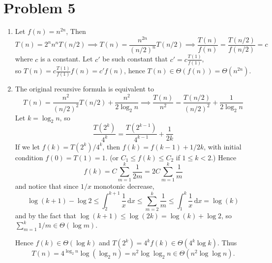 \documentclass[12pt, a4paper]{article}
\newcommand{\dI}{\,\mathrm{d}}
\begin{document}
\section{Problem 5}
\begin{enumerate}
  \item Let $f(n) = n^{2n}$, Then 
    \[ T(n) = 2^n n^n T(n/2) \implies T(n) = \frac{n^{2n}}{(n/2)^n} T(n/2) \implies 
      \frac{T(n)}{f(n)} = \frac{T(n/2)}{f(n/2)} = c\] 
    where $c$ is a constant. Let $c'$ be such constant that $c' = c \frac{T(1)}{f(1)}$,  \\
    so $T(n) = c\frac{T(1)}{f(1)} f(n) = c' f(n)$, hence $T(n) \in \Theta(f(n)) = \Theta(n^{2n})$.
  \item The original recursive formula is equivalent to
    \[ T(n) = \frac{n^2}{(n/2)^2} T(n/2) + \frac{n^2}{2 \log_2 n} \implies 
      \frac{T(n)}{n^2} = \frac{T(n/2)}{(n/2)^2} + \frac{1}{2 \log_2 n} \]
    Let $k = \log_2 n$, so
    \[ \frac{T(2^k)}{4^k} = \frac{T(2^{k-1})}{4^{k-1}} + \frac{1}{2k} \]
    If we let $f(k) = T(2^k) / 4^k$, then $f(k) = f(k-1) + 1 / 2k$, with initial condition $f(0) = 
    T(1) = 1$. (or $C_1 \leq f(k) \leq C_2$ if $1 \leq k < 2$.) Hence 
    \[ f(k) = C \sum_{m = 1}^{k} \frac{1}{2m} = 2C \sum_{m = 1}^{k} \frac{1}{m} \]
    and notice that since $1/x$ monotonic decrease, 
    \[ \log(k+1) - \log 2 \leq \int_{2}^{k+1} \frac{1}{x} \dI x \leq \sum_{m = 2}^{k} \frac{1}{m} 
      \leq \int_1^{k} \frac{1}{x} \dI x = \log(k) \]
    and by the fact that $\log(k+1) \leq \log(2k) = \log(k) + \log 2$, 
    so $\sum\limits_{m=1}^{k} 1/m \in \Theta(\log m)$.

    Hence $f(k) \in \Theta(\log k)$ and $T(2^k) = 4^k f(k) \in \Theta(4^k \log k)$. Thus
    \[ T(n) = 4^{\log_2 n} \log (\log_2 n) = n^2 \log \log_2 n \in \Theta(n^2 \log \log n). \]
\end{enumerate}
\end{document}
